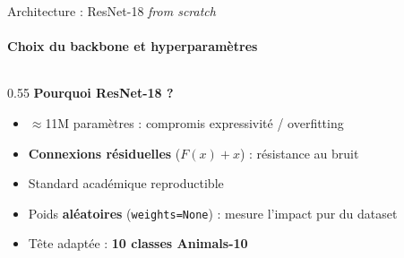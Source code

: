 \documentclass[aspectratio=169, 10pt]{beamer}
\begin{document}
\begin{frame}{Architecture : ResNet-18 \textit{from scratch}}
\framesubtitle{Choix du backbone et hyperparam\`{e}tres}
  \begin{columns}[T]
    \begin{column}{0.55\textwidth}
      \textbf{\color{primary}Pourquoi ResNet-18 ?}
      \begin{itemize}\setlength\itemsep{4pt}
        \item $\approx$11M param\`{e}tres : compromis expressivit\'{e} / overfitting
        \item \textbf{Connexions r\'{e}siduelles} ($F(x)+x$) : r\'{e}sistance au bruit
        \item Standard acad\'{e}mique reproductible
        \item Poids \textbf{al\'{e}atoires} (\texttt{weights=None}) : mesure l'impact pur du dataset
        \item T\^{e}te adapt\'{e}e : \textbf{10 classes Animals-10}
      \end{itemize}


\end{column}
\end{columns}
\end{frame}
\end{document}
